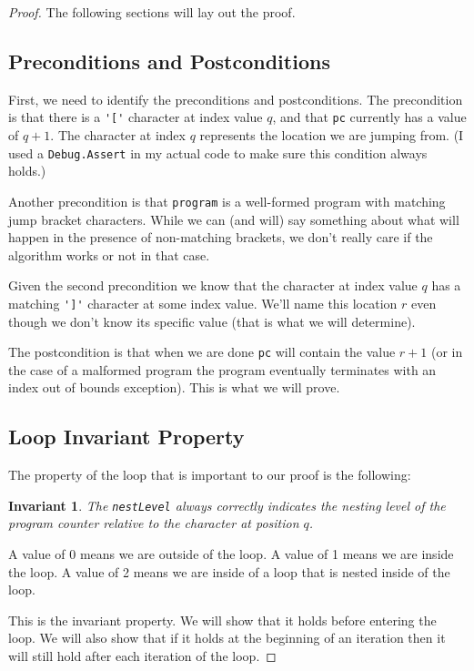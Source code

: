 \documentclass[10pt]{article}
\newcommand{\inl}{\lstinline[breaklines=true]}
\newtheorem*{invariant}{Invariant}
\begin{document}
\begin{proof}
The following sections will lay out the proof.

\subsection*{Preconditions and Postconditions}
First, we need to identify the preconditions and postconditions. The
precondition is that there is a \inl!'['! character at index value $q$, and
that \inl!pc! currently has a value of $q + 1$. The
character at index $q$ represents the location we are jumping from.
(I used a \inl!Debug.Assert! in my actual code to make sure this condition
always holds.) 

Another precondition is that \inl!program! is a well-formed program with
matching jump bracket characters. While we can (and will) say something
about what will happen in the presence of non-matching brackets, we
don't really care if the algorithm works or not in that case.

Given the second precondition we know that the character at index value
$q$ has a matching \inl!']'! character at some index value. We'll name
this location $r$ even though we don't know its specific value (that
is what we will determine).

The postcondition is that when we are done \inl!pc! will
contain the value $r + 1$ (or in the case of a malformed program
the program eventually terminates with an index out of bounds exception).
This is what we will prove.

\subsection*{Loop Invariant Property}
The property of the loop that is important to our proof is the following: 

\begin{invariant}
The \inl!nestLevel! always correctly indicates the nesting level of the
program counter relative to the character at position $q$. 
\end{invariant}

A value of 0 means
we are outside of the loop. A value of 1 means we are inside the loop.
A value of 2 means we are inside of a loop that is nested inside
of the loop.

This is the invariant property. We will show that it holds before entering the
loop.  We will also show that if it holds at the beginning of an
iteration then it will still hold after each iteration of the loop.



\end{proof}
\end{document}
